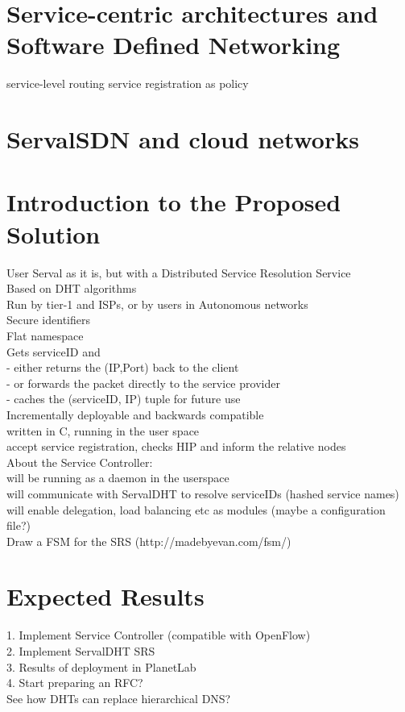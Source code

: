 \documentclass[12pt,a4paper,oneside]{article}
\begin{document}
\section{Service-centric architectures and Software Defined Networking}
service-level routing
service registration as policy

\newpage
\section{ServalSDN and cloud networks}


\newpage
\section{Introduction to the Proposed Solution}
User Serval as it is, but with a Distributed Service Resolution Service
\\Based on DHT algorithms
\\Run by tier-1 and ISPs, or by users in Autonomous networks
\\Secure identifiers
\\Flat namespace
\\Gets serviceID and
\\- either returns the (IP,Port) back to the client
\\- or forwards the packet directly to the service provider
\\- caches the (serviceID, IP) tuple for future use
\\Incrementally deployable and backwards compatible
\\written in C, running in the user space
\\accept service registration, checks HIP and inform the relative nodes
\\About the Service Controller:
\\will be running as a daemon in the userspace
\\will communicate with ServalDHT to resolve serviceIDs (hashed service names)
\\will enable delegation, load balancing etc as modules (maybe a configuration file?)
\\Draw a FSM for the SRS  (http://madebyevan.com/fsm/)


\newpage
\section{Expected Results}
1. Implement Service Controller (compatible with OpenFlow)
\\2. Implement ServalDHT SRS
\\3. Results of deployment in PlanetLab
\\4. Start preparing an RFC?
\\See how DHTs can replace hierarchical DNS?
\end{document}
